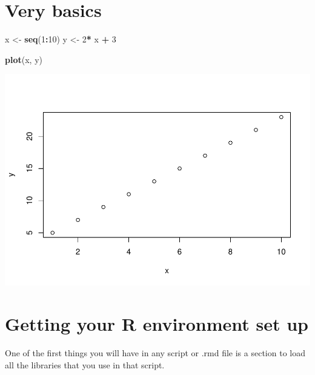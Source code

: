 \documentclass[
]{book}
\newenvironment{Shaded}{\begin{snugshade}}{\end{snugshade}}
\newcommand{\DecValTok}[1]{\textcolor[rgb]{0.00,0.00,0.81}{#1}}
\newcommand{\KeywordTok}[1]{\textcolor[rgb]{0.13,0.29,0.53}{\textbf{#1}}}
\newcommand{\NormalTok}[1]{#1}
\newcommand{\OperatorTok}[1]{\textcolor[rgb]{0.81,0.36,0.00}{\textbf{#1}}}
\newcommand{\StringTok}[1]{\textcolor[rgb]{0.31,0.60,0.02}{#1}}
\begin{document}
\hypertarget{very-basics}{%
\section{Very basics}\label{very-basics}}

\begin{Shaded}
\begin{Highlighting}[]
\NormalTok{x \textless{}{-}}\StringTok{ }\KeywordTok{seq}\NormalTok{(}\DecValTok{1}\OperatorTok{:}\DecValTok{10}\NormalTok{)}
\NormalTok{y \textless{}{-}}\StringTok{ }\DecValTok{2}\OperatorTok{*}\StringTok{ }\NormalTok{x }\OperatorTok{+}\StringTok{ }\DecValTok{3}
\end{Highlighting}
\end{Shaded}

\begin{Shaded}
\begin{Highlighting}[]
\KeywordTok{plot}\NormalTok{(x, y)}
\end{Highlighting}
\end{Shaded}

\includegraphics{test_course_notes_files/figure-latex/unnamed-chunk-4-1.pdf}

\hypertarget{getting-your-r-environment-set-up}{%
\section{Getting your R environment set up}\label{getting-your-r-environment-set-up}}

One of the first things you will have in any script or .rmd file is a section to load all the libraries that you use in that script.
\end{document}
